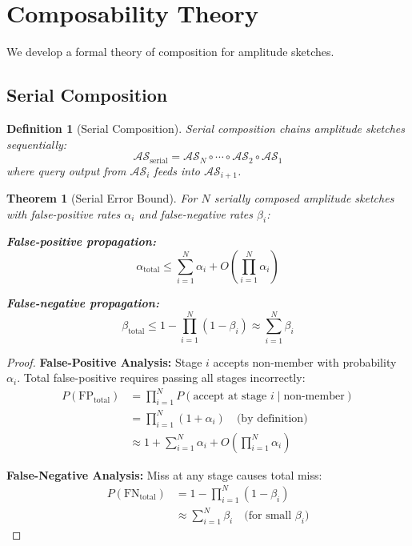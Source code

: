 \documentclass[11pt,letterpaper]{article}
\newtheorem{theorem}{Theorem}
\newtheorem{definition}{Definition}
\begin{document}
\section{Composability Theory}
\label{sec:composability}

We develop a formal theory of composition for amplitude sketches.

\subsection{Serial Composition}

\begin{definition}[Serial Composition]
Serial composition chains amplitude sketches sequentially:
\begin{equation}
\mathcal{AS}_{\text{serial}} = \mathcal{AS}_N \circ \cdots \circ \mathcal{AS}_2 \circ \mathcal{AS}_1
\end{equation}
where query output from $\mathcal{AS}_i$ feeds into $\mathcal{AS}_{i+1}$.
\end{definition}

\begin{theorem}[Serial Error Bound]
\label{thm:serial_error}
For $N$ serially composed amplitude sketches with false-positive rates $\alpha_i$ and false-negative rates $\beta_i$:

\textbf{False-positive propagation:}
\begin{equation}
\alpha_{\text{total}} \leq \sum_{i=1}^N \alpha_i + O\left(\prod_{i=1}^N \alpha_i\right)
\end{equation}

\textbf{False-negative propagation:}
\begin{equation}
\beta_{\text{total}} \leq 1 - \prod_{i=1}^N (1-\beta_i) \approx \sum_{i=1}^N \beta_i
\end{equation}
\end{theorem}

\begin{proof}
\textbf{False-Positive Analysis:} Stage $i$ accepts non-member with probability $\alpha_i$. Total false-positive requires passing all stages incorrectly:
\begin{align}
P(\text{FP}_{\text{total}}) &= \prod_{i=1}^N P(\text{accept at stage } i \mid \text{non-member}) \\
&= \prod_{i=1}^N (1 + \alpha_i) \quad \text{(by definition)} \\
&\approx 1 + \sum_{i=1}^N \alpha_i + O\left(\prod_{i=1}^N \alpha_i\right)
\end{align}

\textbf{False-Negative Analysis:} Miss at any stage causes total miss:
\begin{align}
P(\text{FN}_{\text{total}}) &= 1 - \prod_{i=1}^N (1-\beta_i) \\
&\approx \sum_{i=1}^N \beta_i \quad \text{(for small $\beta_i$)}
\end{align}
\end{proof}
\end{document}
